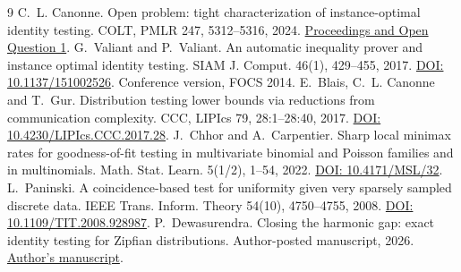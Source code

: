 \documentclass[11pt]{article}
\begin{document}
\begin{thebibliography}{9}
 C.~L. Canonne. Open problem: tight characterization of instance-optimal identity testing. COLT, PMLR 247, 5312--5316, 2024.
\href{https://proceedings.mlr.press/v247/canonne24a.html}{Proceedings and Open Question 1}.
 G.~Valiant and P.~Valiant. An automatic inequality prover and instance optimal identity testing. SIAM J. Comput. 46(1), 429--455, 2017. \href{https://doi.org/10.1137/151002526}{DOI: 10.1137/151002526}. Conference version, FOCS 2014.
 E.~Blais, C.~L. Canonne and T.~Gur. Distribution testing lower bounds via reductions from communication complexity. CCC, LIPIcs 79, 28:1--28:40, 2017.
\href{https://doi.org/10.4230/LIPIcs.CCC.2017.28}{DOI: 10.4230/LIPIcs.CCC.2017.28}.
 J.~Chhor and A.~Carpentier. Sharp local minimax rates for goodness-of-fit testing in multivariate binomial and Poisson families and in multinomials. Math. Stat. Learn. 5(1/2), 1--54, 2022. \href{https://doi.org/10.4171/MSL/32}{DOI: 10.4171/MSL/32}.
 L.~Paninski. A coincidence-based test for uniformity given very sparsely sampled discrete data. IEEE Trans. Inform. Theory 54(10), 4750--4755, 2008. \href{https://doi.org/10.1109/TIT.2008.928987}{DOI: 10.1109/TIT.2008.928987}.
 P.~Dewasurendra. Closing the harmonic gap: exact identity testing for Zipfian distributions. Author-posted manuscript, 2026.
\href{https://andotheror.github.io/p/closing-the-harmonic-gap-exact-identity-testing-for-zipfian-distributi.html}{Author's manuscript}.
\end{thebibliography}
\end{document}

